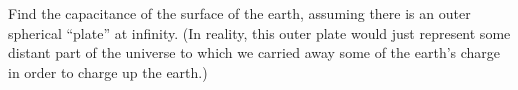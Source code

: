 Find the capacitance of the surface of the
        earth, assuming there is an outer spherical ``plate'' at infinity.
        (In reality, this outer plate would just represent some distant
        part of the universe to which we carried away some of the earth's charge
        in order to charge up the earth.)\answercheck
